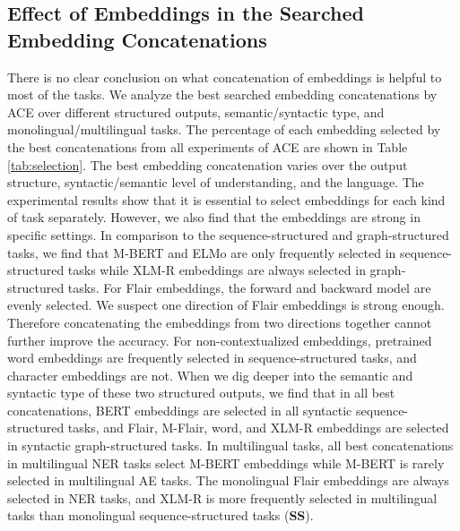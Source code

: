 \documentclass[11pt,a4paper]{article}
\begin{document}
\subsection{Effect of Embeddings in the Searched Embedding Concatenations}
There is no clear conclusion on what concatenation of embeddings is helpful to most of the tasks. 
We analyze the best searched embedding concatenations by ACE over different structured outputs, semantic/syntactic type, and monolingual/multilingual tasks. 
The percentage of each embedding selected by the best concatenations from all experiments of ACE are shown in Table \ref{tab:selection}. 
The best embedding concatenation varies over the output structure, syntactic/semantic level of understanding, and the language. 
The experimental results show that it is essential to select embeddings for each kind of task separately. 
However, we also find that the embeddings are strong in specific settings. In comparison to the sequence-structured and graph-structured tasks, we find that M-BERT and ELMo are only frequently selected in sequence-structured tasks while XLM-R embeddings are always selected in graph-structured tasks. 
For Flair embeddings, the forward and backward model are evenly selected. 
We suspect one direction of Flair embeddings is strong enough. 
Therefore concatenating the embeddings from two directions together cannot further improve the accuracy. 
For non-contextualized embeddings, pretrained word embeddings are frequently selected in sequence-structured tasks, and character embeddings are not.
When we dig deeper into the semantic and syntactic type of these two structured outputs, we find that in all best concatenations, BERT embeddings are selected in all syntactic sequence-structured tasks, and Flair, M-Flair, word, and XLM-R embeddings are selected in syntactic graph-structured tasks. 
In multilingual tasks, all best concatenations in multilingual NER tasks select M-BERT embeddings while M-BERT is rarely selected in multilingual AE tasks. 
The monolingual Flair embeddings are always selected in NER tasks, and XLM-R is more frequently selected in multilingual tasks than monolingual sequence-structured tasks (\textbf{SS}).
\end{document}
